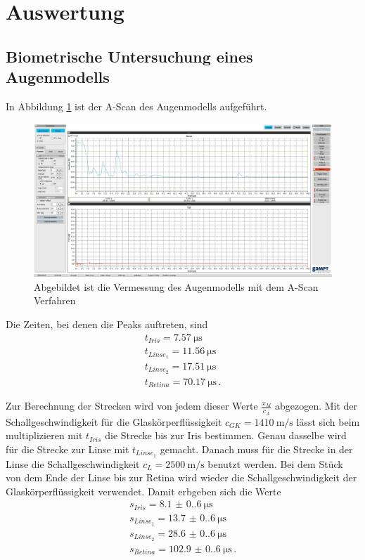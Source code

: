 \section{Auswertung}
\label{sec:Auswertung}


\subsection{Biometrische Untersuchung eines Augenmodells}

In Abbildung \ref{fig:Auge} ist der A-Scan des Augenmodells aufgeführt.
\begin{figure}
  \centering
  \includegraphics[width=\textwidth]{Bilder/Auge1.jpg}
  \caption{Abgebildet ist die Vermessung des Augenmodells mit dem A-Scan Verfahren}
  \label{fig:Auge}
\end{figure}

Die Zeiten, bei denen die Peaks auftreten, sind
\begin{gather*}
  t_{Iris}=   \qty{7.57}{\micro\second}\\
  t_{Linse_1}=\qty{11.56}{\micro\second}\\
  t_{Linse_2}=\qty{17.51}{\micro\second}\\
  t_{Retina}= \qty{70.17}{\micro\second} \, .
\end{gather*}

\noindent Zur Berechnung der Strecken wird von jedem dieser Werte $\frac{x_M}{c_A}$ abgezogen.
Mit der Schallgeschwindigkeit für die Glaskörperflüssigkeit $c_{GK}=\qty{1410}{\meter\per\second}$ lässt sich beim multiplizieren mit $t_{Iris}$ die Strecke bis zur Iris bestimmen.
Genau dasselbe wird für die Strecke zur Linse mit $t_{Linse_1}$ gemacht.
Danach muss für die Strecke in der Linse die Schallgeschwindigkeit $c_L=\qty{2500}{\meter\per\second}$ benutzt werden.
Bei dem Stück von dem Ende der Linse bis zur Retina wird wieder die Schallgeschwindigkeit der Glaskörperflüssigkeit verwendet.
Damit erbgeben sich die Werte
\begin{gather*}
  s_{Iris}=     \qty{8.1(0.6)}{\micro\second}\\
  s_{Linse_1}= \qty{13.7(0.6)}{\micro\second}\\
  s_{Linse_2}= \qty{28.6(0.6)}{\micro\second}\\
  s_{Retina}= \qty{102.9(0.6)}{\micro\second} \, .
\end{gather*}


